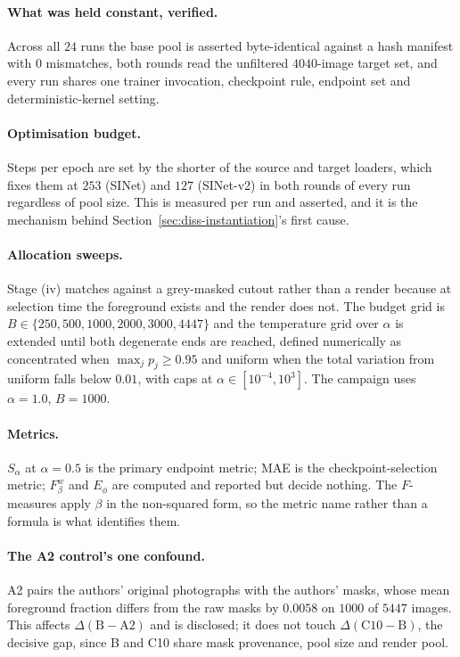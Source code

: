 \documentclass{article} %
\begin{document}
\paragraph{What was held constant, verified.} Across all $24$ runs the base pool is asserted
byte-identical against a hash manifest with $0$ mismatches, both rounds read the unfiltered
$4040$-image target set, and every run shares one trainer invocation, checkpoint rule, endpoint set
and deterministic-kernel setting.

\paragraph{Optimisation budget.} Steps per epoch are set by the shorter of the source and target
loaders, which fixes them at $253$ (SINet) and $127$ (SINet-v2) in both rounds of every run regardless
of pool size. This is measured per run and asserted, and it is the mechanism behind
Section~\ref{sec:diss-instantiation}'s first cause.

\paragraph{Allocation sweeps.} Stage (iv) matches against a grey-masked cutout rather than a render
because at selection time the foreground exists and the render does not. The budget grid is $B \in \{250, 500, 1000, 2000, 3000, 4447\}$ and the
temperature grid over $\alpha$ is extended until both degenerate ends are reached, defined numerically
as concentrated when $\max_j p_j \geq 0.95$ and uniform when the total variation from uniform falls
below $0.01$, with caps at $\alpha \in [10^{-4}, 10^{3}]$. The campaign uses $\alpha = 1.0$, $B = 1000$.

\paragraph{Metrics.} $S_\alpha$ at $\alpha = 0.5$ is the primary endpoint metric; MAE is the
checkpoint-selection metric; $F_\beta^w$ and $E_\phi$ are computed and reported but decide nothing.
The $F$-measures apply $\beta$ in the non-squared form, so the metric name rather than a formula is
what identifies them.

\paragraph{The A2 control's one confound.} A2 pairs the authors' original photographs with the
authors' masks, whose mean foreground fraction differs from the raw masks by $0.0058$ on $1000$ of
$5447$ images. This affects $\Delta(\mathrm{B}-\mathrm{A2})$ and is disclosed; it does not touch
$\Delta(\mathrm{C10}-\mathrm{B})$, the decisive gap, since B and C10 share mask provenance, pool size
and render pool.
\end{document}
